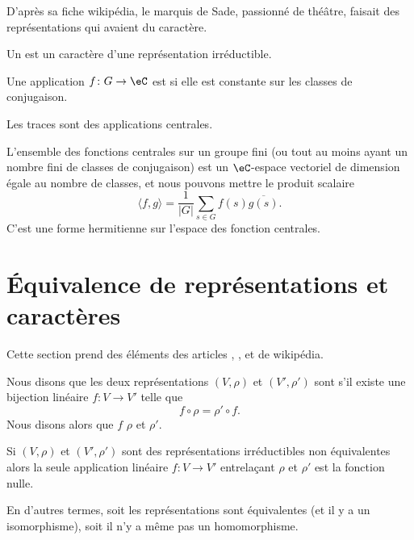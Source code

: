 \tiny
D'après sa fiche wikipédia, le marquis de Sade, passionné de théâtre, faisait des représentations qui avaient du caractère.
\normalsize


Un  est un caractère d'une représentation irréductible.

\begin{definition}
    Une application \( f\colon G\to \eC\) est  si elle est constante sur les classes de conjugaison.
\end{definition}
Les traces sont des applications centrales.

L'ensemble des fonctions centrales sur un groupe fini (ou tout au moins ayant un nombre fini de classes de conjugaison) est un \( \eC\)-espace vectoriel de dimension égale au nombre de classes, et nous pouvons mettre le produit scalaire
\begin{equation}    \label{EqJrEpVI}
    \langle f, g\rangle =\frac{1}{ | G | }\sum_{s\in G}f(s)\overline{ g(s) }.
\end{equation}
C'est une forme hermitienne sur l'espace des fonction centrales.

\section{Équivalence de représentations et caractères}

Cette section prend des éléments des articles , ,  et  de wikipédia.

Nous disons que les deux représentations \( (V,\rho)\) et \( (V',\rho')\) sont  s'il existe une bijection linéaire \( f\colon V\to V'\) telle que
\begin{equation}
    f\circ \rho=\rho'\circ f.
\end{equation}
Nous disons alors que \( f\)  \( \rho\) et \( \rho'\).

\begin{theorem}    \label{ThoyftobH}
    Si \( (V,\rho)\) et \( (V',\rho')\) sont des représentations irréductibles non équivalentes alors la seule application linéaire \( f\colon V\to V'\) entrelaçant \( \rho\) et \( \rho'\) est la fonction nulle.

    En d'autres termes, soit les représentations sont équivalentes (et il y a un isomorphisme), soit il n'y a même pas un homomorphisme.
\end{theorem}

